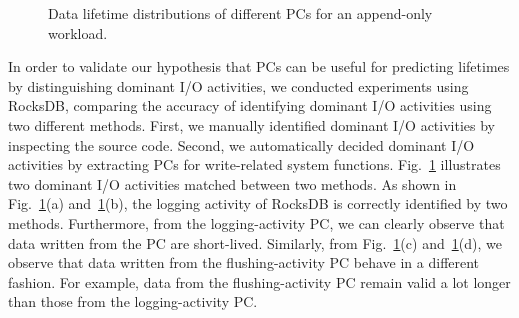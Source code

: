 \begin{figure}[t]
\centering
\hfill
	\hspace{2pt}
\hfill
\vspace{7pt}
	\hspace{2pt}
\caption{Data lifetime distributions of different PCs for an append-only workload.} 
\label{fig:types_and_PCs}
\end{figure}

In order to validate our hypothesis that PCs can be useful for predicting
lifetimes by distinguishing dominant I/O activities, we conducted experiments
using RocksDB, comparing the accuracy of identifying dominant I/O activities
using two different methods.  First, we manually identified dominant I/O
activities by inspecting the source code. Second, we automatically decided
dominant I/O activities by extracting PCs for write-related system functions.
Fig.~\ref{fig:types_and_PCs} illustrates two dominant I/O activities matched
between two methods.   As shown in Fig.~\ref{fig:types_and_PCs}(a)
and~\ref{fig:types_and_PCs}(b), the logging activity of RocksDB is correctly
identified by two methods.  Furthermore, from the logging-activity PC, we can
clearly observe that data written from the PC are short-lived. Similarly,
from Fig.~\ref{fig:types_and_PCs}(c) and~\ref{fig:types_and_PCs}(d), we observe
that data written from the flushing-activity PC behave in a different fashion.
For example, data from the flushing-activity PC remain valid a lot longer than
those from the logging-activity PC.

